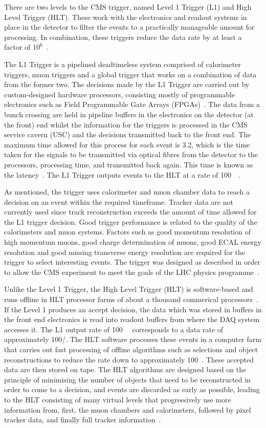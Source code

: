 There are two levels to the CMS trigger, named Level 1 Trigger (L1) and High Level Trigger (HLT). These work
with the electronics and readout systems in place in the detector to filter the events to a practically
manageable amount for processing. In combination, these triggers reduce the data rate by at least a factor of
$10^{6}$~\cite{CMS_experiment}.

The L1 Trigger is a pipelined deadtimeless system comprised of calorimeter triggers, muon triggers and a
global trigger that works on a combination of data from the former two. The decisions made by the L1 Trigger
are carried out by custom-designed hardware processors, consisting mostly of programmable electronics such
as Field Programmable Gate Arrays (FPGAs)~\cite{1742-6596-219-3-032009}. The data from a bunch crossing are held in
pipeline buffers in the electronics on the detector (at the front) end whilst the information for the triggers
is processed in the CMS service cavern (USC) and the decisions transmitted back to the front end. The maximum
time allowed for this process for each event is 3.2\us, which is the time taken for the signals to be
transmitted via optical fibres from the detector to the processors, processing time, and transmitted back
again. This time is known as the latency~\cite{CMS_TDR1}. The L1 Trigger outputs events to the HLT at a rate
of 100~\kHz~\cite{CMS_experiment}.

As mentioned, the trigger uses calorimeter and muon chamber data to reach a decision on an event
within the required timeframe. Tracker data are not currently used since track reconstruction exceeds the
amount of time allowed for the L1 trigger decision. Good trigger performance is related to the quality of the
calorimeters and muon systems. Factors such as good momentum resolution of high momentum muons, good charge
determination of muons, good ECAL energy resolution and good missing transverse energy resolution are required
for the trigger to select interesting events. The trigger was designed as described in order to allow the CMS
experiment to meet the goals of the LHC physics programme~\cite{CMS_experiment}.

Unlike the Level 1 Trigger, the High Level Trigger (HLT) is software-based and runs offline in HLT processor
farms of about a thousand commerical processors~\cite{CMS_TDR1}. If the Level 1 produces an accept decision,
the data which was stored in buffers in the front end electronics is read into readout buffers from where the
DAQ system accesses it. The L1 output rate of 100~\kHz~ corresponds to a data rate of approximately 100\GB/\s.
The HLT software processes these events in a computer farm that carries out fast processing of offline
algorithms such as selections and object reconstructions to reduce the rate down to approximately 100~\Hz.
These accepted data are then stored on tape. The HLT algorithms are designed based on the principle of
minimising the number of objects that need to be reconstructed in order to come to a decision, and events are
discarded as early as possible, leading to the HLT consisting of many virtual levels that progressively use
more information from, first, the muon chambers and calorimeters, followed by pixel tracker data, and finally
full tracker information~\cite{CMS_TDR1}.

